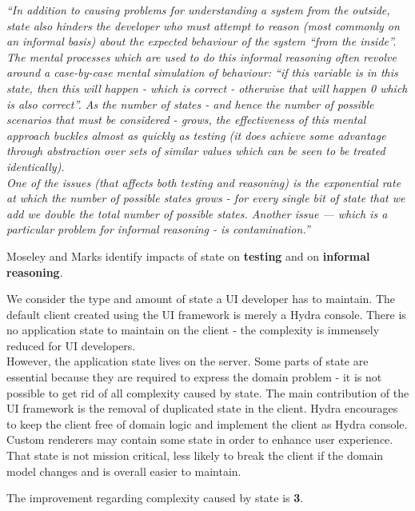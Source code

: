 \textit{``In addition to causing problems for understanding a system from the outside, state also hinders the developer who must attempt to reason (most commonly on an informal basis) about the expected behaviour of the system “from the inside”. \\ The mental processes which are used to do this informal reasoning often revolve around a case-by-case mental simulation of behaviour: “if this variable is in this state, then this will happen - which is correct - otherwise that will happen 0 which is also correct”. As the number of states - and hence the number of possible scenarios that must be considered - grows, the effectiveness of this mental approach buckles almost as quickly as testing (it does achieve some advantage through abstraction over sets of similar values which can be seen to be treated identically). \\ One of the issues (that affects both testing and reasoning) is the exponential rate at which the number of possible states grows - for every single bit of state that we add we double the total number of possible states. Another issue — which is a particular problem for informal reasoning - is contamination.''} \citep[p.~7]{outoftarpit}

Moseley and Marks identify impacts of state on \textbf{testing} and on \textbf{informal reasoning}.

We consider the type and amount of state a UI developer has to maintain. The default client created using the UI framework is merely a Hydra \gls{console}. There is no application state to maintain on the client - the complexity is immensely reduced for UI developers. \\
However, the application state lives on the server. Some parts of state are essential because they are required to express the domain problem - it is not possible to get rid of all complexity caused by state. The main contribution of the UI framework is the removal of duplicated state in the client. Hydra encourages to keep the client free of domain logic and implement the client as Hydra \gls{console}. Custom renderers may contain some state in order to enhance user experience. That state is not mission critical, less likely to break the client if the domain model changes and is overall easier to maintain.

The improvement regarding complexity caused by state is \textbf{3}.

